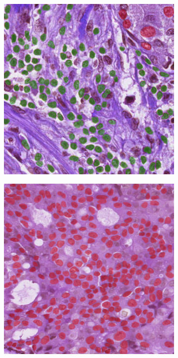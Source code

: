 \begin{figure}[H]
    \centering
    \begin{subfigure}[b]{0.3\textwidth}
    \includegraphics[width=\textwidth]{imgs/qual/monusac/gt1.overlay.png}
  \end{subfigure}
  \begin{subfigure}[b]{0.3\textwidth}
    \includegraphics[width=\textwidth]{imgs/qual/monusac/gt2.overlay.png}

\end{subfigure}
\end{figure}
